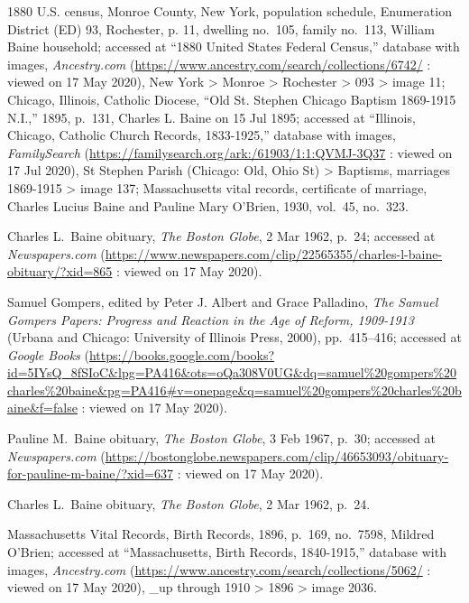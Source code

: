 \begin{thebibliography}{999}
1880 U.S. census, Monroe County, New York, population schedule, Enumeration District (ED) 93, Rochester, p. 11, dwelling no.\ 105, family no.\ 113, William Baine household; accessed at ``1880 United States Federal Census,'' database with images, \textit{Ancestry.com} (\url{https://www.ancestry.com/search/collections/6742/} : viewed on 17 May 2020), New York > Monroe > Rochester > 093 > image 11; Chicago, Illinois, Catholic Diocese, ``Old St. Stephen Chicago Baptism 1869-1915 N.I.,'' 1895, p.\ 131, Charles L. Baine on 15 Jul 1895; accessed at ``Illinois, Chicago, Catholic Church Records, 1833-1925,'' database with images, \textit{FamilySearch} (\url{https://familysearch.org/ark:/61903/1:1:QVMJ-3Q37} : viewed on 17 Jul 2020), St Stephen Parish (Chicago: Old, Ohio St) > Baptisms, marriages 1869-1915 > image 137; Massachusetts vital records, certificate of marriage, Charles Lucius Baine and Pauline Mary O'Brien, 1930, vol.\ 45, no.\ 323.

Charles L.\ Baine obituary, \textit{The Boston Globe}, 2 Mar 1962, p.\ 24; accessed at \textit{Newspapers.com} (\url{https://www.newspapers.com/clip/22565355/charles-l-baine-obituary/?xid=865} : viewed on 17 May 2020).

Samuel Gompers, edited by Peter J. Albert and Grace Palladino, \textit{The Samuel Gompers Papers: Progress and Reaction in the Age of Reform, 1909-1913} (Urbana and Chicago: University of Illinois Press, 2000), pp.\ 415--416; accessed at \textit{Google Books} (\url{https://books.google.com/books?id=5IYsQ\_8fSIoC\&lpg=PA416\&ots=oQa308V0UG\&dq=samuel\%20gompers\%20charles\%20baine\&pg=PA416\#v=onepage\&q=samuel\%20gompers\%20charles\%20baine\&f=false} : viewed on 17 May 2020).

Pauline M.\ Baine obituary, \textit{The Boston Globe}, 3 Feb 1967, p.\ 30; accessed at \textit{Newspapers.com} (\url{https://bostonglobe.newspapers.com/clip/46653093/obituary-for-pauline-m-baine/?xid=637} : viewed on 17 May 2020).

Charles L.\ Baine obituary, \textit{The Boston Globe}, 2 Mar 1962, p.\ 24.


Massachusetts Vital Records, Birth Records, 1896, p.\ 169, no.\ 7598, Mildred O'Brien; accessed at ``Massachusetts, Birth Records, 1840-1915,'' database with images, \textit{Ancestry.com} (\url{https://www.ancestry.com/search/collections/5062/} : viewed on 17 May 2020), \_up through 1910 > 1896 > image 2036.


\end{thebibliography}
